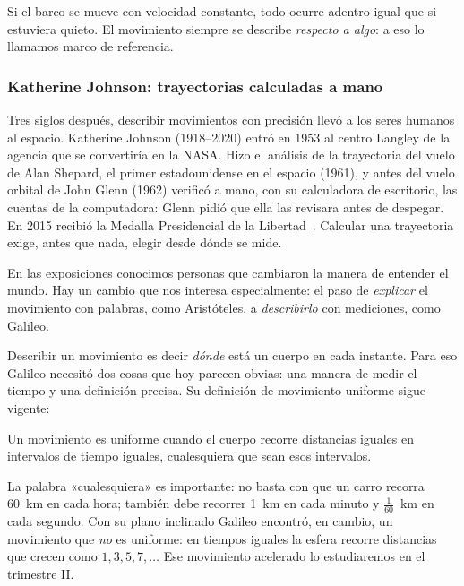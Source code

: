 \documentclass[11pt]{article}
\begin{document}
Si el barco se mueve con velocidad constante, todo ocurre adentro igual que si estuviera
quieto. El movimiento siempre se describe \emph{respecto a algo}: a eso lo llamamos marco de
referencia.

\subsubsection*{Katherine Johnson: trayectorias calculadas a mano}

Tres siglos después, describir movimientos con precisión llevó a los seres humanos al
espacio. Katherine Johnson (1918--2020) entró en 1953 al centro Langley de la agencia que se
convertiría en la NASA. Hizo el análisis de la trayectoria del vuelo de Alan Shepard, el
primer estadounidense en el espacio (1961), y antes del vuelo orbital de John Glenn (1962)
verificó a mano, con su calculadora de escritorio, las cuentas de la computadora: Glenn pidió
que ella las revisara antes de despegar. En 2015 recibió la Medalla Presidencial de la
Libertad~\cite{nasaJohnson}. Calcular una trayectoria exige, antes que nada, elegir desde
dónde se mide.

\label{tema:cientificos}

\begin{hilo}
En las exposiciones conocimos personas que cambiaron la manera de entender el mundo. Hay un
cambio que nos interesa especialmente: el paso de \emph{explicar} el movimiento con palabras,
como Aristóteles, a \emph{describirlo} con mediciones, como Galileo.
\end{hilo}

Describir un movimiento es decir \emph{dónde} está un cuerpo en cada instante. Para eso
Galileo necesitó dos cosas que hoy parecen obvias: una manera de medir el tiempo y una
definición precisa. Su definición de movimiento uniforme sigue vigente:

\begin{definicion}
Un movimiento es uniforme cuando el cuerpo recorre distancias iguales en intervalos de tiempo
iguales, cualesquiera que sean esos intervalos.
\end{definicion}

La palabra «cualesquiera» es importante: no basta con que un carro recorra \qty{60}{km} en
cada hora; también debe recorrer \qty{1}{km} en cada minuto y $\frac{1}{60}$~km en cada segundo.
Con su plano inclinado Galileo encontró, en cambio, un movimiento que \emph{no} es uniforme:
en tiempos iguales la esfera recorre distancias que crecen como $1, 3, 5, 7, \ldots$ Ese
movimiento acelerado lo estudiaremos en el trimestre II.
\end{document}
